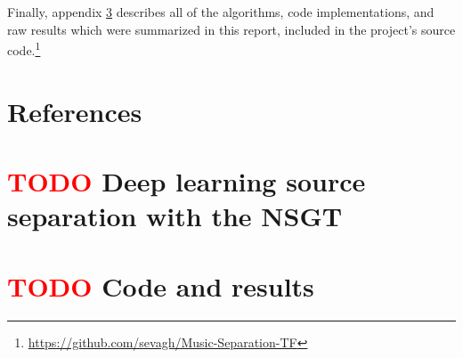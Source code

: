 \documentclass[letter,12pt]{article}
\begin{document}
Finally, appendix \ref{appendix:listings} describes all of the algorithms, code implementations, and raw results which were summarized in this report, included in the project's source code.\footnote{\url{https://github.com/sevagh/Music-Separation-TF}}

\vfill
\clearpage %

\section{References}
\printbibliography[heading=none]

\vfill
\clearpage %

\begin{appendices}

\section{\textbf{\textcolor{red}{TODO }}Deep learning source separation with the NSGT}
\label{appendix:ml}

\section{\textbf{\textcolor{red}{TODO }}Code and results}
\label{appendix:listings}

\end{appendices}
\end{document}
